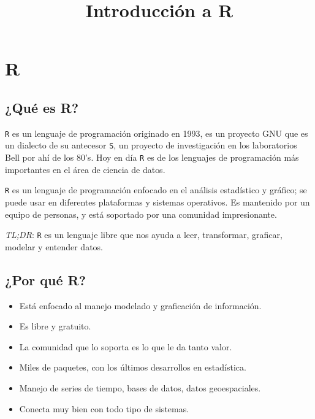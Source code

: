\documentclass[
]{article}
\title{Introducción a R}
\author{}
\date{\vspace{-2.5em}}
\providecommand{\tightlist}{%
  \setlength{\itemsep}{0pt}\setlength{\parskip}{0pt}}
\begin{document}
\maketitle

{
\setcounter{tocdepth}{2}
\tableofcontents
}
\hypertarget{r}{%
\section{R}\label{r}}

\hypertarget{quuxe9-es-r}{%
\subsection{¿Qué es R?}\label{quuxe9-es-r}}

\texttt{R} es un lenguaje de programación originado en 1993, es un
proyecto GNU que es un dialecto de su antecesor \texttt{S}, un proyecto
de investigación en los laboratorios Bell por ahí de los 80's. Hoy en
día \texttt{R} es de los lenguajes de programación más importantes en el
área de ciencia de datos.

\texttt{R} es un lenguaje de programación enfocado en el análisis
estadístico y gráfico; se puede usar en diferentes plataformas y
sistemas operativos. Es mantenido por un equipo de personas, y está
soportado por una comunidad impresionante.

\emph{TL;DR}: \texttt{R} es un lenguaje libre que nos ayuda a leer,
transformar, graficar, modelar y entender datos.

\hypertarget{por-quuxe9-r}{%
\subsection{¿Por qué R?}\label{por-quuxe9-r}}

\begin{itemize}
\tightlist
\item
  Está enfocado al manejo modelado y graficación de información.
\item
  Es libre y gratuito.
\item
  La comunidad que lo soporta es lo que le da tanto valor.
\item
  Miles de paquetes, con los últimos desarrollos en estadística.
\item
  Manejo de series de tiempo, bases de datos, datos geoespaciales.
\item
  Conecta muy bien con todo tipo de sistemas.
\end{itemize}
\end{document}
